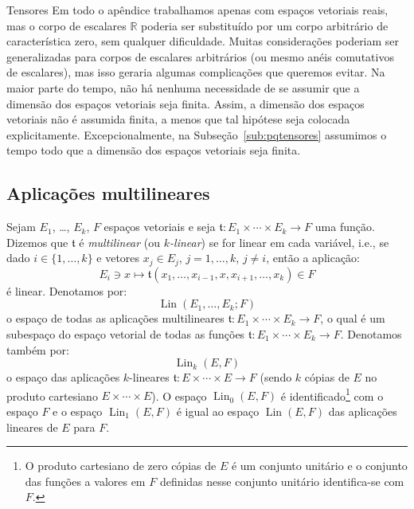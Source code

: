 \documentclass[oneside,11pt]{amsart}
\newcommand{\R}{\mathds R}
\DeclareMathOperator{\Lin}{Lin}
\theoremstyle{remark}\newtheorem{exercise}{Exercício}[section]
\theoremstyle{plain}\newtheorem{teo}{Teorema}[section]
\theoremstyle{plain}\newtheorem{lem}[teo]{Lema}
\theoremstyle{plain}\newtheorem{prop}[teo]{Proposição}
\theoremstyle{definition}\newtheorem{defin}[teo]{Definição}
\theoremstyle{remark}\newtheorem{rem}[teo]{Observação}
\theoremstyle{definition}\newtheorem{example}[teo]{Exemplo}
\numberwithin{equation}{section}
\begin{document}
\begin{section}{Tensores}
Em todo o apêndice trabalhamos apenas com espaços vetoriais reais, mas o corpo de escalares $\R$ poderia ser substituído por um corpo arbitrário de característica
zero, sem qualquer dificuldade. Muitas considerações poderiam ser generalizadas para corpos de escalares arbitrários (ou mesmo anéis comutativos de escalares),
mas isso geraria algumas complicações que queremos evitar. Na maior parte do tempo, não há nenhuma necessidade de se assumir que a dimensão dos espaços vetoriais
seja finita. Assim, a dimensão dos espaços vetoriais não é assumida finita, a menos que tal hipótese seja colocada explicitamente. Excepcionalmente, na
Subseção~\ref{sub:pqtensores} assumimos o tempo todo que a dimensão dos espaços vetoriais seja finita.

\subsection{Aplicações multilineares}\label{sub:multilinear}
Sejam $E_1$, \dots, $E_k$, $F$ espaços vetoriais e seja $\mathfrak t:E_1\times\cdots\times E_k\to F$ uma função. Dizemos que $\mathfrak t$ é
{\em multilinear\/} (ou {\em $k$-linear})
se for linear em cada variável, i.e., se dado $i\in\{1,\ldots,k\}$ e vetores $x_j\in E_j$, $j=1,\ldots,k$, $j\ne i$, então a aplicação:
\[E_i\ni x\longmapsto\mathfrak t(x_1,\ldots,x_{i-1},x,x_{i+1},\ldots,x_k)\in F\]
é linear. Denotamos por:
\[\Lin(E_1,\ldots,E_k;F)\]
o espaço de todas as aplicações
multilineares $\mathfrak t:E_1\times\cdots\times E_k\to F$, o qual é um subespaço do espaço vetorial de todas as funções $\mathfrak t:E_1\times\cdots\times E_k\to F$.
Denotamos também por:
\[\Lin_k(E,F)\]
o espaço das aplicações $k$-lineares $\mathfrak t:E\times\cdots\times E\to F$ (sendo $k$ cópias de $E$ no produto cartesiano $E\times\cdots\times E$).
O espaço $\Lin_0(E,F)$ é identificado\footnote{%
O produto cartesiano de zero cópias de $E$ é um conjunto unitário e o conjunto das funções a valores em $F$ definidas nesse conjunto unitário identifica-se
com $F$.} com o espaço $F$ e o espaço $\Lin_1(E,F)$ é igual ao espaço $\Lin(E,F)$ das aplicações lineares de $E$ para $F$.


\end{section}
\end{document}
